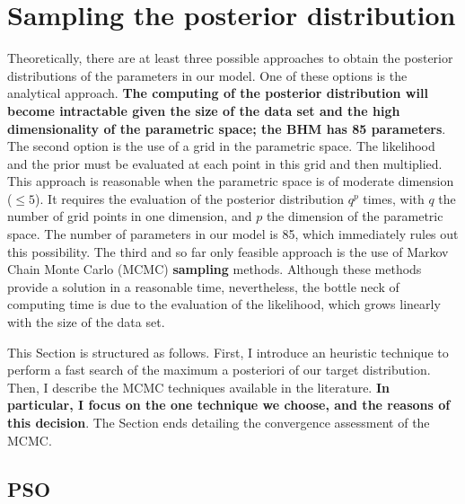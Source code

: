 \section{Sampling the posterior distribution}

Theoretically, there are at least three possible approaches to obtain the posterior distributions of the parameters in our model. One of these options is the analytical approach. \textbf{The computing of the posterior distribution will become intractable given the size of the data set and the high dimensionality of the parametric space; the BHM has 85 parameters}. The second option is the use of a grid in the parametric space. The likelihood and the prior must be evaluated at each point in this grid and then multiplied. This approach is reasonable when the parametric space is of moderate dimension ($\leq 5$). It requires the evaluation of the posterior distribution $q^p$ times, with $q$ the number of grid points in one dimension, and $p$ the dimension of the parametric space. The number of parameters in our model is 85, which immediately rules out this possibility. The third and so far only feasible approach is the use of Markov Chain Monte Carlo (MCMC) \textbf{sampling} methods. Although these methods provide a solution in a reasonable time, nevertheless, the bottle neck of computing time is due to the evaluation of the likelihood, which grows linearly with the size of the data set. 

This Section is structured as follows. First, I introduce an heuristic technique to perform a fast search of the maximum a posteriori of our target distribution. Then, I describe the MCMC techniques available in the literature.\textbf{ In particular, I focus on the one technique we choose, and the reasons of this decision}. The Section ends detailing the convergence assessment of the MCMC.

\subsection{PSO}

